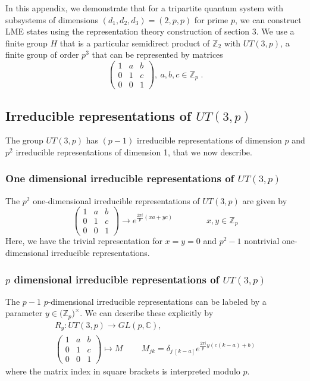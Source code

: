 \documentclass[12pt]{article}
\theoremstyle{definition}
\newcommand{\be}{\begin{equation}}
\newcommand{\ee}{\end{equation}}
\begin{document}
In this appendix, we demonstrate that for a tripartite quantum system with subsystems of dimensions $(d_1,d_2,d_3) = (2,p,p)$ for prime $p$, we can construct LME states using the representation theory construction of section 3. We use a finite group $H$ that is a particular semidirect product of $\mathbb{Z}_2$ with $UT(3,p)$, a finite group of order $p^3$ that can be represented by matrices
\begin{equation}
\label{UT}
\begin{pmatrix}
1 & a & b \\
0 & 1 & c \\
0 & 0 & 1
\end{pmatrix}
,~a,b,c \in \mathbb{Z}_p \; .
\end{equation}

\subsection{Irreducible representations of $UT(3,p)$}

The group $UT(3,p)$ has $(p-1)$ irreducible representations of dimension $p$ and $p^2$ irreducible representations of dimension 1, that we now describe.

\subsubsection*{One dimensional irreducible representations of $UT(3,p)$}
The $p^2$ one-dimensional irreducible representations of $UT(3,p)$ are given by
\be
\label{RUT}
\begin{pmatrix}
1 & a & b \\
0 & 1 & c \\
0 & 0 & 1
\end{pmatrix}
\to e^{\frac{2 \pi i}{p} (x a + y c)} \qquad \qquad x,y \in \mathbb{Z}_p
\ee
Here, we have the trivial representation for $x=y=0$ and $p^2-1$ nontrivial one-dimensional irreducible representations.

\subsubsection*{$p$ dimensional irreducible representations of $UT(3,p)$}

The $p-1$ $p$-dimensional irreducible representations can be labeled by a parameter $y \in \big(\mathbb{Z}_p\big)^{\times}$. We can describe these explicitly by
\begin{equation}
\begin{gathered}
R_y: UT(3,p) \rightarrow GL(p, \mathbb{C}),\\
\begin{pmatrix}
1 & a & b \\
0 & 1 & c \\
0 & 0 & 1
\end{pmatrix}
\mapsto M \qquad ~M_{jk} = \delta_{j \; [k - a]} e^{\frac{2 \pi i}{p} y (c(k-a)+b)}
\end{gathered}
\end{equation}
where the matrix index in square brackets is interpreted modulo $p$. 
\end{document}
